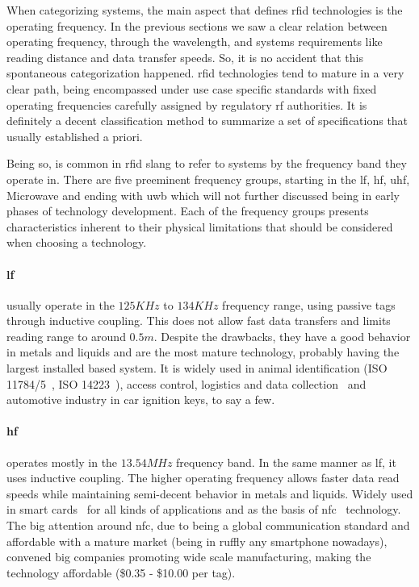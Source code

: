 When categorizing systems, the main aspect that defines \ac{rfid} technologies is the operating frequency.
In the previous sections we saw a clear relation between operating frequency, through the wavelength, and systems requirements like reading distance and data transfer speeds.
So, it is no accident that this spontaneous categorization happened. \ac{rfid} technologies tend to mature in a very clear path, being encompassed under use case specific standards with fixed operating frequencies carefully assigned by regulatory \ac{rf} authorities. 
It is definitely a decent classification method to summarize a set of specifications that usually established a priori.

Being so, is common in \ac{rfid} slang to refer to systems by the frequency band they operate in.
There are five preeminent frequency groups, starting in the \ac{lf}, \ac{hf}, \ac{uhf}, Microwave and ending with \ac{uwb} which will not further discussed being in early phases of technology development.
Each of the frequency groups presents characteristics inherent to their physical limitations that should be considered when choosing a technology.

\paragraph*{\ac{lf}} usually operate in the $125KHz$ to $134KHz$ frequency range, using passive tags through inductive coupling. This does not allow fast data transfers and limits reading range to around $0.5m$. Despite the drawbacks, they have a good behavior in metals and liquids and are the most mature technology, probably having the largest installed based system.
It is widely used in animal identification (ISO 11784/5~\cite{isoISO117841996, isoISO117851996}, ISO 14223~\cite{isoISO1422332018}), access control, logistics and data collection~\cite{isoISOIEC180002} and automotive industry in car ignition keys, to say a few.

\paragraph*{\ac{hf}} operates mostly in the $13.54MHz$ frequency band. In the same manner as \ac{lf}, it uses inductive coupling. The higher operating frequency allows faster data read speeds while maintaining semi-decent behavior in metals and liquids.
Widely used in smart cards~\cite{isoISOIEC156932, MIFARE} for all kinds of applications and as the basis of \ac{nfc}~\cite{isoISOIEC144434, isoISOIEC180003} technology. The big attention around \ac{nfc}, due to being a global communication standard and affordable with a mature market (being in ruffly any smartphone nowadays), convened big companies promoting wide scale manufacturing, making the technology affordable (\$0.35 - \$10.00 per tag).

